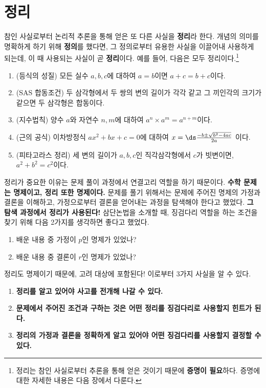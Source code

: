 \pagebreak

\section{정리}

참인 사실로부터 논리적 추론을 통해 얻은 또 다른 사실을 \textbf{정리}라 한다. 개념의 의미를 명확하게 하기 위해 \textbf{정의}를 했다면, 그 정의로부터 유용한 사실을 이끌어내 사용하게 되는데, 이 때 사용되는 사실이 곧 \textbf{정리}이다. 예를 들어, 다음은 모두 정리이다.\footnote{정리는 참인 사실로부터 추론을 통해 얻은 것이기 때문에 \textbf{증명이 필요}하다. 증명에 대한 자세한 내용은 다음 장에서 다룬다.}

\begin{enumerate}
    \item (등식의 성질) 모든 실수 \(a, b, c\)에 대하여 \(a = b\)이면 \(a + c = b + c\)이다.
    \item (SAS 합동조건) 두 삼각형에서 두 쌍의 변의 길이가 각각 같고 그 끼인각의 크기가 같으면 두 삼각형은 합동이다.
    \item (지수법칙) 양수 \(a\)와 자연수 \(n, m\)에 대하여 \(a^n \times a^m = a^{n + m}\)이다.
    \item (근의 공식) 이차방정식 \(ax^2 + bx + c = 0\)에 대하여 \(x = \ds \frac{-b \pm \sqrt{b^2 - 4ac}}{2a}\) 이다.
    \item (피타고라스 정리) 세 변의 길이가 \(a, b, c\)인 직각삼각형에서 \(c\)가 빗변이면, \(a^2 + b^2 = c^2\)이다.
\end{enumerate}

정리가 중요한 이유는 문제 풀이 과정에서 연결고리 역할을 하기 때문이다. \textbf{수학 문제는 명제이고, 정리 또한 명제이다.} 문제를 풀기 위해서는 문제에 주어진 명제의 가정과 결론을 이해하고, 가정으로부터 결론을 얻어내는 과정을 탐색해야 한다고 했었다. \textbf{그 탐색 과정에서 정리가 사용된다!} 삼단논법을 소개할 때, 징검다리 역할을 하는 조건을 찾기 위해 다음 2가지를 생각하면 좋다고 했었다.

\begin{enumerate}
    \item 배운 내용 중 가정이 \(p\)인 명제가 있었나?
    \item 배운 내용 중 결론이 \(r\)인 명제가 있었나?
\end{enumerate}

정리도 명제이기 때문에, 고려 대상에 포함된다! 이로부터 3가지 사실을 알 수 있다.

\begin{enumerate}
    \item \textbf{정리를 알고 있어야 사고를 전개해 나갈 수 있다.}
    \item \textbf{문제에서 주어진 조건과 구하는 것은 어떤 정리를 징검다리로 사용할지 힌트가 된다.}
    \item \textbf{정리의 가정과 결론을 정확하게 알고 있어야 어떤 징검다리를 사용할지 결정할 수 있다.}
\end{enumerate}

